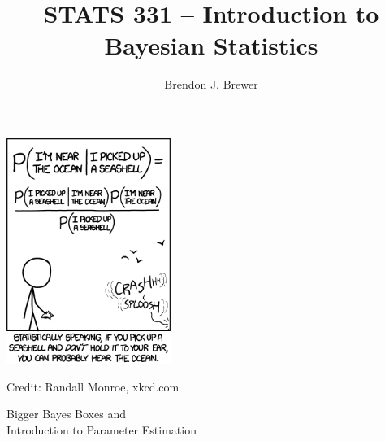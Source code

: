 \documentclass{beamer}
\author{Brendon J. Brewer}
\title{STATS 331 -- Introduction to Bayesian Statistics}
\institute{The University of Auckland}
\date{}
\begin{document}
\frame{\titlepage}

\begin{frame}
\begin{center}
\includegraphics[width=0.4\textwidth]{images/seashell.png}

Credit: Randall Monroe, xkcd.com
\end{center}


\end{frame}


\begin{frame}

\begin{center}
\Large
Bigger Bayes Boxes and \\
Introduction to Parameter Estimation
\end{center}

\end{frame}
\end{document}
